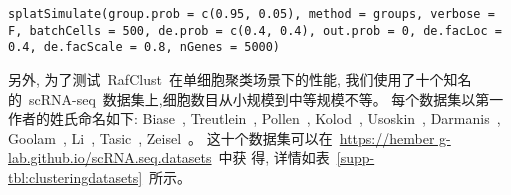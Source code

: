 \texttt{splatSimulate(group.prob = c(0.95, 0.05), method = groups, 
verbose = F, batchCells = 500, de.prob = c(0.4, 0.4), out.prob = 0, 
de.facLoc = 0.4, de.facScale = 0.8, nGenes = 5000)}

另外, 为了测试~RafClust~在单细胞聚类场景下的性能,
我们使用了十个知名的~scRNA-seq~数据集上,细胞数目从小规模到中等规模不等。
每个数据集以第一作者的姓氏命名如下: 
Biase~\cite{biase2014cell},
Treutlein~\cite{treutlein2014reconstructing}, 
Pollen~\cite{pollen2014low}, 
Kolod~\cite{kolodziejczyk2015single}, 
Usoskin~\cite{usoskin2015unbiased}, 
Darmanis~\cite{darmanis2015survey}, 
Goolam~\cite{goolam2016heterogeneity}, 
Li~\cite{li2017reference},
Tasic~\cite{tasic2016adult}, 
Zeisel~\cite{zeisel2015cell}。
这十个数据集可以在~\url{https://hember g-lab.github.io/scRNA.seq.datasets}~中获
得, 详情如表~\ref{supp-tbl:clusteringdatasets}~所示。

